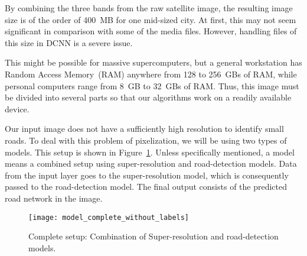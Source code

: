 By combining the three bands from the raw satellite image, the resulting image size is of the order of 400~MB for one mid-sized city. At first, this may not seem significant in comparison with some of the media files. However, handling files of this size in DCNN is a severe issue. 

This might be possible for massive supercomputers, but a general workstation has Random Access Memory~(RAM) anywhere from 128 to 256~GBs of RAM, while personal computers range from 8~GB to 32~GBs of RAM. Thus, this image must be divided into several parts so that our algorithms work on a readily available device.

Our input image does not have a sufficiently high resolution to identify small roads. To deal with this problem of pixelization, we will be using two types of models. This setup is shown in Figure~\ref{fig:model_complete_without_labels}. Unless specifically mentioned, a model means a combined setup using super-resolution and road-detection models. Data from the input layer goes to the super-resolution model, which is consequently passed to the road-detection model. The final output consists of the predicted road network in the image.

\begin{figure}[h!]
  \centering
  \texttt{[image: model\_complete\_without\_labels]}
  \caption{Complete setup: Combination of Super-resolution and road-detection models.}
  \label{fig:model_complete_without_labels}
\end{figure}
